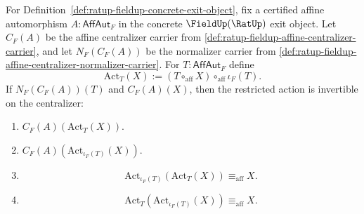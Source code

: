 \begin{theorem}
\label{thm:ratup-fieldup-affine-centralizer-normalizer-action-inverse}
For Definition~\ref{def:ratup-fieldup-concrete-exit-object}, fix a certified
affine automorphism $A:\mathsf{AffAut}_F$ in the concrete $\FieldUp(\RatUp)$
exit object. Let $C_F(A)$ be the affine centralizer carrier from
\autoref{def:ratup-fieldup-affine-centralizer-carrier}, and let
$N_F(C_F(A))$ be the normalizer carrier from
\autoref{def:ratup-fieldup-affine-centralizer-normalizer-carrier}. For
$T:\mathsf{AffAut}_F$ define
$$
\mathrm{Act}_T(X):=(T\circ_{\mathrm{aff}}X)\circ_{\mathrm{aff}}\iota_F(T).
$$
If $N_F(C_F(A))(T)$ and $C_F(A)(X)$, then the restricted action is invertible on
the centralizer:
\begin{enumerate}
\item $C_F(A)(\mathrm{Act}_T(X))$.
\item $C_F(A)(\mathrm{Act}_{\iota_F(T)}(X))$.
\item
$$
\mathrm{Act}_{\iota_F(T)}(\mathrm{Act}_T(X))\equiv_{\mathrm{aff}}X.
$$
\item
$$
\mathrm{Act}_T(\mathrm{Act}_{\iota_F(T)}(X))\equiv_{\mathrm{aff}}X.
$$
\end{enumerate}
\end{theorem}
